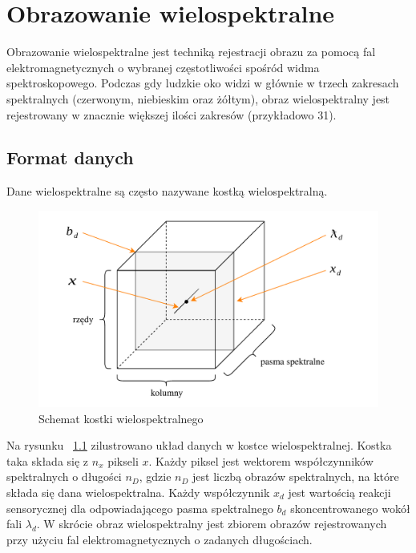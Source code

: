 
\chapter{Obrazowanie wielospektralne}
Obrazowanie wielospektralne jest techniką rejestracji obrazu za pomocą fal elektromagnetycznych o wybranej częstotliwości spośród widma spektroskopowego. Podczas gdy ludzkie oko widzi w głównie w trzech zakresach spektralnych (czerwonym, niebieskim oraz żółtym), obraz wielospektralny jest rejestrowany w znacznie większej ilości zakresów (przykładowo 31).

\section{Format danych}
 Dane wielospektralne są często nazywane kostką wielospektralną. 

\begin{figure}[ht]
	\centering
		\includegraphics[width=0.75\linewidth]{rys02/multispectral-cube-vector}
	\caption{Schemat kostki wielospektralnego}
	\label{fig:multispectral-cube}	
\end{figure}

Na rysunku ~\ref{fig:multispectral-cube} zilustrowano układ danych w kostce wielospektralnej. Kostka taka składa się z $n_x$ pikseli $x$. Każdy piksel jest wektorem współczynników spektralnych o długości  $n_D$, gdzie $n_D$ jest liczbą obrazów spektralnych, na które składa się dana wielospektralna. Każdy współczynnik $x_d$ jest wartością reakcji sensorycznej dla odpowiadającego pasma spektralnego $b_d$ skoncentrowanego wokół fali $\lambda_d$. W skrócie obraz wielospektralny jest zbiorem obrazów rejestrowanych przy użyciu fal elektromagnetycznych o zadanych długościach. 


